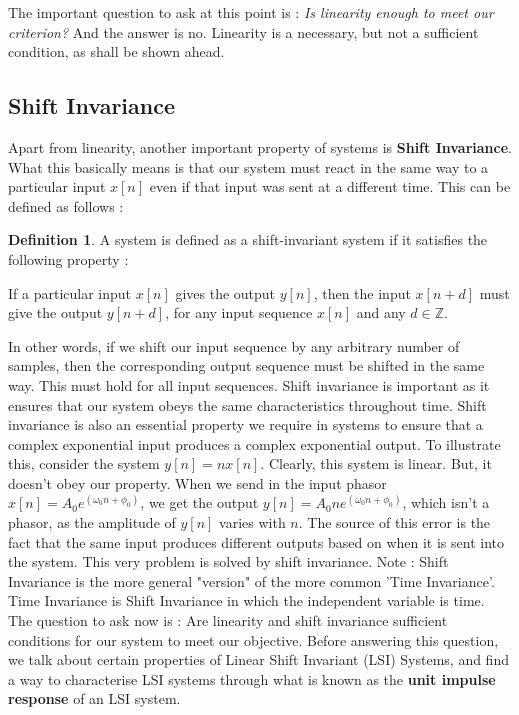\documentclass{article}
\theoremstyle{definition}
\newtheorem{defn}[theorem]{Definition}
\begin{document}
	 The important question to ask at this point is : \textit{Is linearity enough to meet our criterion?} And the answer is no. Linearity is a necessary, but not a sufficient condition, as shall be shown ahead.
	 
	 \subsection{Shift Invariance}
	 
	 Apart from linearity, another important property of systems is \textbf{Shift Invariance}. What this basically means is that our system must react in the same way to a particular input $x[n]$ even if that input was sent at a different time. This can be defined as follows :
	 
	 \begin{defn}
	 A system is defined as a shift-invariant system if it satisfies the following property : 
	 
	 If a particular input $x[n]$ gives the output $y[n]$, then the input $x[n+d]$ must give the output $y[n+d]$, for any input sequence $x[n]$ and any $d \in \mathbb{Z}$.
	 \end{defn}
	 
	 In other words, if we shift our input sequence by any arbitrary number of samples, then the corresponding output sequence must be shifted in the same way. This must hold for all input sequences. Shift invariance is important as it ensures that our system obeys the same characteristics throughout time. Shift invariance is also an essential property we require in systems to ensure that a complex exponential input produces a complex exponential output. To illustrate this, consider the system $y[n] = n x[n]$. Clearly, this system is linear. But, it doesn't obey our property. When we send in the input phasor $x[n] = A_0 e^{(\omega_0 n + \phi_0)}$, we get the output $y[n] = A_0 n e^{(\omega_0 n + \phi_0)}$, which isn't a phasor, as the amplitude of $y[n]$ varies with $n$. The source of this error is the fact that the same input produces different outputs based on when it is sent into the system. This very problem is solved by shift invariance. \smallskip
	 Note : Shift Invariance is the more general "version" of the more common 'Time Invariance'. Time Invariance is Shift Invariance in which the independent variable is time. The question to ask now is : Are linearity and shift invariance sufficient conditions for our system to meet our objective. Before answering this question, we talk about certain properties of Linear Shift Invariant (LSI) Systems, and find a way to characterise LSI systems through what is known as the \textbf{unit impulse response} of an LSI system.
	 
\end{document}
